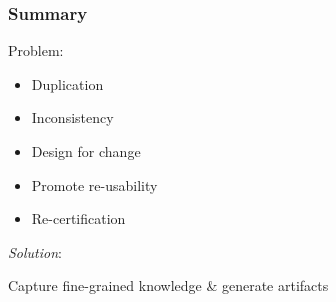 \documentclass{beamer}
\newcommand{\red}{\textcolor{red}}
\newcommand{\ro}[1]{\only<#1>{\red}}
\begin{document}
\begin{frame}
\frametitle{Summary}

Problem:
\begin{itemize}
\item Duplication
\item Inconsistency
\item Design for change
\item Promote re-usability
\item Re-certification
\end{itemize}

\emph{Solution}:
\begin{center}
Capture fine-grained knowledge \& generate \ro{1}{ALL} artifacts
\end{center}


\end{frame}

\end{document}
